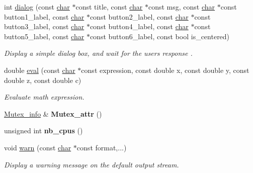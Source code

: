 \begin{DoxyCompactItemize}
\mbox{\label{namespacecimg__library__suffixed_1_1cimg_a89ad6cacc2ade7f8077d34fc6f455dc3}} 
int \hyperlink{namespacecimg__library__suffixed_1_1cimg_a89ad6cacc2ade7f8077d34fc6f455dc3}{dialog} (const \hyperlink{classchar}{char} $\ast$const title, const \hyperlink{classchar}{char} $\ast$const msg, const \hyperlink{classchar}{char} $\ast$const button1\+\_\+label, const \hyperlink{classchar}{char} $\ast$const button2\+\_\+label, const \hyperlink{classchar}{char} $\ast$const button3\+\_\+label, const \hyperlink{classchar}{char} $\ast$const button4\+\_\+label, const \hyperlink{classchar}{char} $\ast$const button5\+\_\+label, const \hyperlink{classchar}{char} $\ast$const button6\+\_\+label, const bool is\+\_\+centered)
\begin{DoxyCompactList}\small\item\em Display a simple dialog box, and wait for the user\textquotesingle{}s response . \end{DoxyCompactList}\item 
double \hyperlink{namespacecimg__library__suffixed_1_1cimg_a4574a27654d00ba42a108368fa9d7e64}{eval} (const \hyperlink{classchar}{char} $\ast$const expression, const double x, const double y, const double z, const double c)
\begin{DoxyCompactList}\small\item\em Evaluate math expression. \end{DoxyCompactList}\item 
\mbox{\label{namespacecimg__library__suffixed_1_1cimg_aa0e1bc96ae6e235dc5b67b8b0a466166}} 
\hyperlink{structcimg__library__suffixed_1_1cimg_1_1Mutex__info}{Mutex\+\_\+info} \& {\bfseries Mutex\+\_\+attr} ()
\item 
\mbox{\label{namespacecimg__library__suffixed_1_1cimg_ad359a27ccc2eea27d3a6f1073b2a2ad7}} 
unsigned int {\bfseries nb\+\_\+cpus} ()
\item 
void \hyperlink{namespacecimg__library__suffixed_1_1cimg_acfd3624d72ed7f79c82ec45646c685e7}{warn} (const \hyperlink{classchar}{char} $\ast$const format,...)
\begin{DoxyCompactList}\small\item\em Display a warning message on the default output stream. \end{DoxyCompactList}\item 

\end{DoxyCompactItemize}
